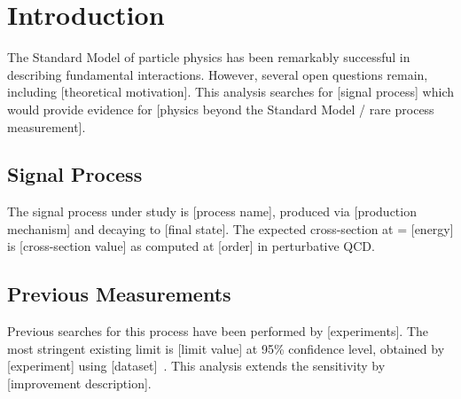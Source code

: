 
\section{Introduction}
\label{sec:introduction}


The Standard Model of particle physics has been remarkably successful in
describing fundamental interactions. However, several open questions remain,
including [theoretical motivation]. This analysis searches for [signal process]
which would provide evidence for [physics beyond the Standard Model / rare
process measurement].


\subsection{Signal Process}
\label{sec:intro:signal}

The signal process under study is [process name], produced via [production
mechanism] and decaying to [final state]. The expected cross-section at
\sqrts = [energy] is [cross-section value] as computed at [order] in
perturbative QCD.


\subsection{Previous Measurements}
\label{sec:intro:previous}

Previous searches for this process have been performed by [experiments].
The most stringent existing limit is [limit value] at 95\% confidence level,
obtained by [experiment] using [dataset]~\cite{previous_result}.
This analysis extends the sensitivity by [improvement description].


